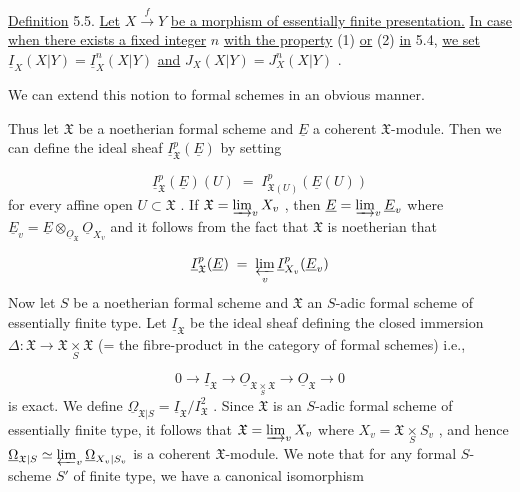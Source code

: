 \underline{Definition} 5.5.   \underline{Let} $X \overset{f}{\to} Y$ \underline{be a morphism of essentially finite presentation.} \underline{In case when there exists a fixed integer} $n$ \underline{with the property} (1) \underline{or} (2) \underline{in} 5.4,
\underline{we set}  $\underline{I}_X(X|Y) = \underline{I}^n_X(X|Y)$  \underline{and}  $J_X(X|Y) = J^n_X(X|Y)$ .

We can extend this notion to formal schemes in an obvious manner.

Thus let $\mathfrak{X}$ be a noetherian formal scheme and $\underline{E}$ a coherent $\mathfrak{X}$-module. Then we can define the ideal sheaf $\underline{I}^p_{\mathfrak{X}}(\underline{E})$ by setting

\begin{equation*}
\underline{I}^p_{\mathfrak{X}}(\underline{E})(U) \;=\; I^p_{\mathfrak{X}(U)}(\underline{E}(U))
\end{equation*}
for every affine open $U \subset \mathfrak{X}$ . If $\mathfrak{X} = \varinjlim_{v} X_v$ , then $\underline{E} = \varinjlim_{v} \underline{E}_v$ where $\underline{E}_v = \underline{E} \otimes_{\underline{O}_{\mathfrak{X}}} \underline{O}_{X_v}$ and it follows from the fact that $\mathfrak{X}$ is noetherian that

\begin{equation*}
\underline{I}^p_{\mathfrak{X}}(\underline{E}) \;=\; \varprojlim_{v} \underline{I}^p_{X_v}(\underline{E}_v)
\end{equation*}
Now let $S$ be a noetherian formal scheme and $\mathfrak{X}$ an $S$-adic formal scheme of essentially finite type. Let $\underline{I}_{\mathfrak{X}}$ be the ideal sheaf defining the closed immersion $\Delta : \mathfrak{X} \to \mathfrak{X} \underset{S}{\times} \mathfrak{X}$ (= the fibre-product in the category of formal schemes) i.e.,

\begin{equation*}
0 \to \underline{I}_{\mathfrak{X}} \to \underline{O}_{\mathfrak{X} \underset{S}{\times} \mathfrak{X}} \to \underline{O}_{\mathfrak{X}} \to 0
\end{equation*}
is exact. We define $\underline{\Omega}_{\mathfrak{X}|S} = \underline{I}_{\mathfrak{X}}/I^2_{\mathfrak{X}}$ . Since $\mathfrak{X}$ is an $S$-adic formal scheme of essentially finite type, it follows that $\mathfrak{X} = \varinjlim_{v} X_v$ where $X_v = \mathfrak{X} \underset{S}{\times} S_v$ , and hence $\underline{\Omega}_{\mathfrak{X}|S} \simeq \varprojlim_{v} \underline{\Omega}_{X_v|S_v}$ is a coherent $\mathfrak{X}$-module. We note that for any formal $S$-scheme $S'$ of finite type, we have a canonical isomorphism

